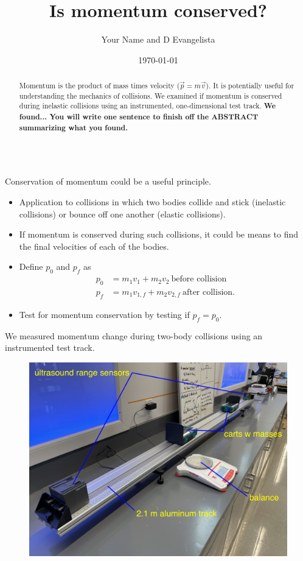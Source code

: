 \documentclass[pdf,serif]{beamer}
\title{Is momentum conserved?}
\author{Your Name and D Evangelista}
\institute{Morristown-Beard School}
\date{\today}
\begin{document}
\begin{frame}{}
\begin{columns}[T,totalwidth=\textwidth]
\begin{column}{14.33in}
\begin{minipage}[t][\textheight]{\linewidth}
\begin{abstract}
Momentum is the product of mass times velocity ($\vec{p}=m\vec{v}$). It is potentially useful for understanding the mechanics of collisions. We examined if momentum is conserved during inelastic collisions using an instrumented, one-dimensional test track. \textbf{We found... You will write one sentence to finish off the ABSTRACT summarizing what you found.}
\end{abstract}
\vfill
\begin{block}{Conservation of momentum could be a useful principle.}
\begin{itemize}
\item Application to collisions in which two bodies collide and stick (inelastic collisions) or bounce off one another (elastic collisions). 
\item If momentum is conserved during such collisions, it could be means to find the final velocities of each of the bodies. 
\item Define $p_0$ and $p_f$ as
\begin{align*}
p_0 &= m_1 v_1 + m_2 v_2\ \text{before collision} \\
p_f &= m_1 v_{1,f} + m_2 v_{2,f}\ \text{after collision}. 
\end{align*}
\item Test for momentum conservation by testing if $p_f=p_0$.
\end{itemize}
\end{block}
\vfill
\begin{block}{We measured momentum change during two-body collisions using an instrumented test track.}
\begin{figure}[h]
\begin{center}
\includegraphics[width=0.8\columnwidth]{fig1.png}

\end{center}
\end{figure}
\end{block}
\end{minipage}
\end{column}
\end{columns}
\end{frame}
\end{document}
